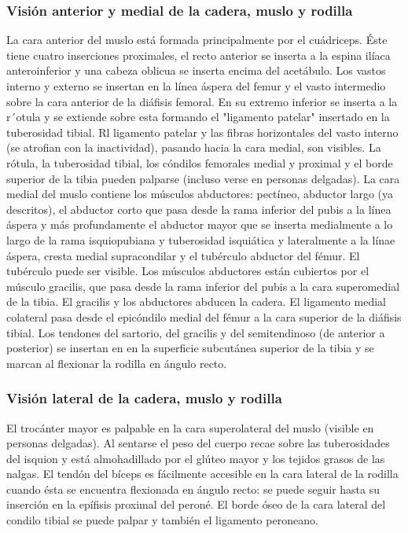 \documentclass[a4paper,12pt]{article} %
\begin{document}
\begin{appendices}
\subsubsection{Visión anterior y medial de la cadera, muslo y rodilla}
La cara anterior del muslo está formada principalmente por el cuádriceps. Éste tiene cuatro inserciones proximales, el recto anterior se inserta a la espina ilíaca anteroinferior y una cabeza oblicua se inserta encima del acetábulo. Los vastos interno y externo se insertan en la línea áspera del femur y el vasto intermedio sobre la cara anterior de la diáfisis femoral. En su extremo inferior se inserta a la r´otula y se extiende sobre esta formando el "ligamento patelar" insertado en la tuberosidad tibial. Rl ligamento patelar y las fibras horizontales del vasto interno (se atrofian con la inactividad), pasando hacia la cara medial, son visibles. La rótula, la tuberosidad tibial, los cóndilos femorales medial y proximal y el borde superior de la tibia pueden palparse (incluso verse en personas delgadas).
La cara medial del muslo contiene los músculos abductores: pectíneo, abductor largo (ya descritos), el abductor corto que pasa desde la rama inferior del pubis a la línea áspera y más profundamente el abductor mayor que se inserta medialmente a lo largo de la rama isquiopubiana y tuberosidad isquiática y lateralmente a la línae áspera, cresta medial supracondilar y el tubérculo abductor del fémur. El tubérculo puede ser visible.
Los músculos abductores están cubiertos por el músculo gracilis, que pasa desde la rama inferior del pubis a la cara superomedial de la tibia. El gracilis y los abductores abducen la cadera.
El ligamento medial colateral pasa desde el epicóndilo medial del fémur a la cara superior de la diáfisis tibial. Los tendones del sartorio, del gracilis y del semitendinoso (de anterior a posterior) se insertan en en la superficie subcutánea superior de la tibia y se marcan al flexionar la rodilla en ángulo recto.

\subsubsection{Visión lateral de la cadera, muslo y rodilla}
El trocánter mayor es palpable en la cara superolateral del muslo (visible en personas delgadas). Al sentarse el peso del cuerpo recae sobre las tuberosidades del isquion y está almohadillado por el glúteo mayor y los tejidos grasos de las nalgas.
El tendón del bíceps es fácilmente accesible en la cara lateral de la rodilla cuando ésta se encuentra flexionada en ángulo recto: se puede seguir hasta su inserción en la epífisis proximal del peroné. El borde óseo de la cara lateral del condilo tibial se puede palpar y también el ligamento peroneano.


\end{appendices}
\end{document}
